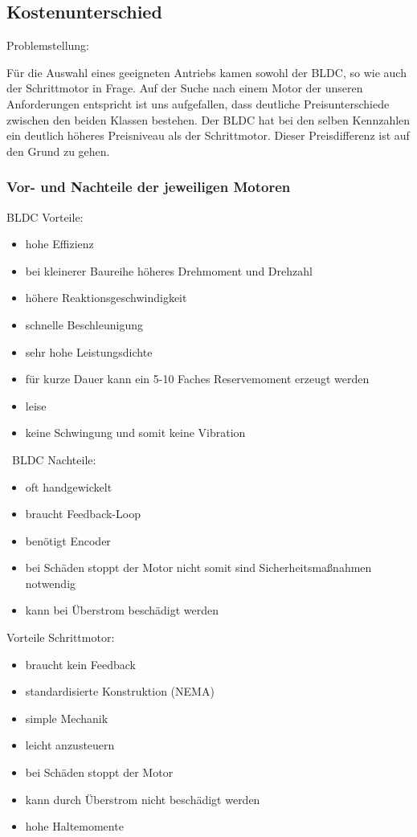 \renewcommand{\autoren}{Aleksandar Stoiljkovic}

\subsection{Kostenunterschied}
Problemstellung:
\par\bigskip
Für die Auswahl eines geeigneten Antriebs kamen sowohl der BLDC, so wie auch der Schrittmotor in Frage. Auf der Suche nach einem Motor der unseren Anforderungen entspricht ist uns aufgefallen, dass deutliche Preisunterschiede zwischen den beiden Klassen bestehen. Der BLDC hat bei den selben Kennzahlen ein deutlich höheres Preisniveau als der Schrittmotor. Dieser Preisdifferenz ist auf den Grund zu gehen.
\subsubsection{Vor- und Nachteile der jeweiligen Motoren}
BLDC Vorteile:
\begin{itemize}
	\item hohe Effizienz
	\item bei kleinerer Baureihe höheres Drehmoment und Drehzahl
	\item höhere Reaktionsgeschwindigkeit
	\item schnelle Beschleunigung
	\item sehr hohe Leistungsdichte
	\item für kurze Dauer kann ein 5-10 Faches Reservemoment erzeugt werden
	\item leise
	\item keine Schwingung und somit keine Vibration
\end{itemize}
\
BLDC Nachteile:
\begin{itemize}
	\item oft handgewickelt
	\item braucht Feedback-Loop
	\item benötigt Encoder
	\item bei Schäden stoppt der Motor nicht somit sind Sicherheitsmaßnahmen notwendig 
	\item kann bei Überstrom beschädigt werden
	
\end{itemize}
\newpage
Vorteile Schrittmotor:
\begin{itemize}
\item braucht kein Feedback
\item standardisierte Konstruktion (NEMA)
\item simple Mechanik
\item leicht anzusteuern
\item bei Schäden stoppt der Motor
\item kann durch Überstrom nicht beschädigt werden
\item hohe Haltemomente

\end{itemize}
